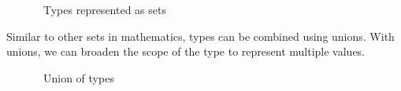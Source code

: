 \begin{figure}[h]
  \centering
  \caption{~Types represented as sets}
\end{figure}

Similar to other sets in mathematics, types can be combined using unions. With unions, we can broaden the scope of the type to represent multiple values.

\begin{figure}[h]
  \centering
  \caption{~Union of types}
\end{figure}

